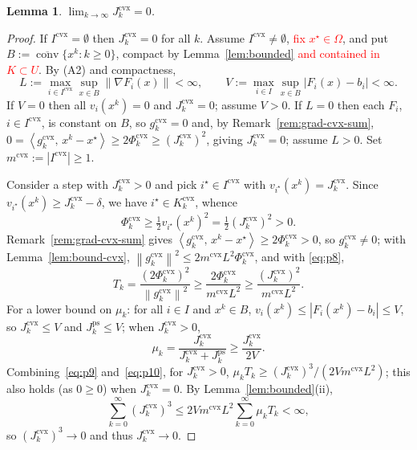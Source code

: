 \documentclass[]{interact}
\theoremstyle{plain}
\newtheorem{lemma}[theorem]{Lemma}
\theoremstyle{definition}
\theoremstyle{remark}
\newcommand{\norm}[1]{\left\lVert #1 \right\rVert}
\newcommand{\abs}[1]{\left\lvert #1 \right\rvert}
\newcommand{\inner}[2]{\left\langle #1,\, #2 \right\rangle}
\DeclareMathOperator{\conv}{conv}
\newcommand{\cvx}{\mathrm{cvx}}
\newcommand{\ps}{\mathrm{ps}}
\begin{document}
\begin{lemma}\label{lem:jcvx0}
$\displaystyle\lim_{k\to\infty}J^{\cvx}_k=0$.
\end{lemma}
\begin{proof}
If $I^{\cvx}=\emptyset$ then $J^{\cvx}_k=0$ for all $k$. Assume $I^{\cvx}\ne\emptyset$, \leavevmode\textcolor{red}{fix
$x^\star\in\Omega$}, and put $B:=\overline{\conv}\{x^k:k\ge0\}$, compact by Lemma~\ref{lem:bounded} \leavevmode\textcolor{red}{and contained
in $K\subset U$}. By (A2) and
compactness,
\[
L:=\max_{i\in I^{\cvx}}\sup_{x\in B}\norm{\nabla F_i(x)}<\infty,\qquad
V:=\max_{i\in I}\sup_{x\in B}\abs{F_i(x)-b_i}<\infty.
\]
If $V=0$ then all $v_i(x^k)=0$ and
$J^{\cvx}_k=0$; assume $V>0$. If $L=0$ then each $F_i$, $i\in I^{\cvx}$, is constant on
$B$, so $g^{\cvx}_k=0$ and, by Remark~\ref{rem:grad-cvx-sum},
$0=\inner{g^{\cvx}_k}{x^k-x^\star}\ge 2\Phi^{\cvx}_k\ge(J^{\cvx}_k)^2$, giving
$J^{\cvx}_k=0$; assume $L>0$. Set $m^{\cvx}:=\abs{I^{\cvx}}\ge1$.

Consider a step with $J^{\cvx}_k>0$ and pick $i^\star\in I^{\cvx}$ with
$v_{i^\star}(x^k)=J^{\cvx}_k$. Since $v_{i^\star}(x^k)\ge J^{\cvx}_k-\delta$, we have
$i^\star\in K^{\cvx}_k$, whence
\begin{equation}\label{eq:p8}
\Phi^{\cvx}_k\ge\tfrac12 v_{i^\star}(x^k)^2=\tfrac12(J^{\cvx}_k)^2>0 .
\end{equation}
Remark~\ref{rem:grad-cvx-sum} gives
$\inner{g^{\cvx}_k}{x^k-x^\star}\ge2\Phi^{\cvx}_k>0$, so $g^{\cvx}_k\ne0$; with
Lemma~\ref{lem:bound-cvx}, $\norm{g^{\cvx}_k}^2\le2m^{\cvx}L^2\Phi^{\cvx}_k$, and with
\eqref{eq:p8},
\begin{equation}\label{eq:p9}
T_k=\frac{(2\Phi^{\cvx}_k)^2}{\norm{g^{\cvx}_k}^2}\ge\frac{2\Phi^{\cvx}_k}{m^{\cvx}L^2}\ge\frac{(J^{\cvx}_k)^2}{m^{\cvx}L^2}.
\end{equation}
For a lower bound on $\mu_k$: for all $i\in I$ and $x^k\in B$,
$v_i(x^k)\le\abs{F_i(x^k)-b_i}\le V$, so $J^{\cvx}_k\le V$ and $J^{\ps}_k\le V$; when
$J^{\cvx}_k>0$,
\begin{equation}\label{eq:p10}
\mu_k=\frac{J^{\cvx}_k}{J^{\cvx}_k+J^{\ps}_k}\ge\frac{J^{\cvx}_k}{2V}.
\end{equation}
Combining~\eqref{eq:p9} and~\eqref{eq:p10}, for $J^{\cvx}_k>0$,
$\mu_k T_k\ge(J^{\cvx}_k)^3/(2Vm^{\cvx}L^2)$; this also holds (as $0\ge0$) when
$J^{\cvx}_k=0$. By Lemma~\ref{lem:bounded}(ii),
\begin{equation}\label{eq:p12}
\sum_{k=0}^\infty(J^{\cvx}_k)^3\le 2Vm^{\cvx}L^2\sum_{k=0}^\infty\mu_k T_k<\infty,
\end{equation}
so $(J^{\cvx}_k)^3\to0$ and thus $J^{\cvx}_k\to0$.
\end{proof}
\end{document}
